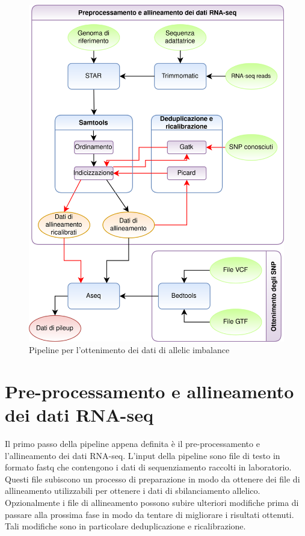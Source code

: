   \begin{figure}%
    \centering
    \includegraphics[scale=0.2]{pipeline.png}
    \caption{Pipeline per l'ottenimento dei dati di allelic imbalance}
    \label{fig:proj_pipeline}
  \end{figure}

  \section{Pre-processamento e allineamento dei dati RNA-seq}
  \label{sec:pre_all_rna_seq}
  Il primo passo della pipeline appena definita \`e il pre-processamento e l'allineamento dei dati RNA-seq.
  L'input della pipeline sono file di testo in formato fastq che contengono i dati di sequenziamento raccolti in laboratorio.
  Questi file subiscono un processo di preparazione in modo da ottenere dei file di allineamento utilizzabili per ottenere i dati di sbilanciamento allelico.
  Opzionalmente i file di allineamento possono subire ulteriori modifiche prima di passare alla prossima fase in modo da tentare di migliorare i risultati ottenuti.
  Tali modifiche sono in particolare deduplicazione e ricalibrazione.

